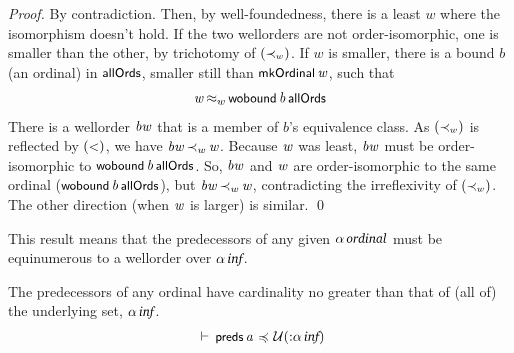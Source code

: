 \documentclass[11pt]{llncs}
\renewcommand{\HOLConst}[1]{{\textsf{\upshape\small #1}}}
\renewcommand{\HOLTyOp}[1]{\mbox{\fontencoding{T1}\fontfamily{bch}\fontseries{m}\fontshape{it}\fontsize{9.5}{10}\selectfont #1}}
\renewcommand{\HOLinline}[1]{\ensuremath{#1}}
\newenvironment{holmath}{\begin{displaymath}\begin{array}{l}}{\end{array}\end{displaymath}\ignorespacesafterend}
\begin{document}
\begin{proof}
By contradiction.
Then, by well-foundedness, there is a least $w$ where the isomorphism doesn't hold.
If the two wellorders are not order-isomorphic, one is smaller than the other, by trichotomy of \HOLinline{(\HOLConst{{\ensuremath{\prec_w}}})}.
If $w$ is smaller, there is a bound $b$ (an ordinal) in \HOLinline{\HOLConst{allOrds}}, smaller still than \HOLinline{\HOLConst{mkOrdinal}\,\HOLFreeVar{w}}, such that
\begin{holmath}
\HOLFreeVar{w}\,\ensuremath{{\approx_w}}\,\HOLConst{wobound}\,\HOLFreeVar{b}\,\HOLConst{allOrds}
\end{holmath}
There is a wellorder \HOLinline{\HOLFreeVar{bw}} that is a member of $b$'s equivalence class.
As \HOLinline{(\HOLConst{{\ensuremath{\prec_w}}})} is reflected by \HOLinline{(\HOLConst{\ensuremath{{<}}})}, we have \HOLinline{\HOLFreeVar{bw}\,{\ensuremath{\prec_w}}\,\HOLFreeVar{w}}.
Because \HOLinline{\HOLFreeVar{w}} was least, \HOLinline{\HOLFreeVar{bw}} must be order-isomorphic to \HOLinline{\HOLConst{wobound}\,\HOLFreeVar{b}\,\HOLConst{allOrds}}.
So, \HOLinline{\HOLFreeVar{bw}} and \HOLinline{\HOLFreeVar{w}} are order-isomorphic to the same ordinal (\HOLinline{\HOLConst{wobound}\,\HOLFreeVar{b}\,\HOLConst{allOrds}}), but \HOLinline{\HOLFreeVar{bw}\,{\ensuremath{\prec_w}}\,\HOLFreeVar{w}}, contradicting the irreflexivity of \HOLinline{(\HOLConst{{\ensuremath{\prec_w}}})}.
The other direction (when \HOLinline{\HOLFreeVar{w}} is larger) is similar.
\qed
\end{proof}

This result means that the predecessors of any given \HOLinline{\ensuremath{\alpha}\,\HOLTyOp{ordinal}} must be equinumerous to a wellorder over \HOLinline{\ensuremath{\alpha}\,\HOLTyOp{inf}}.

\begin{corollary}
\label{clly:card-preds}
The predecessors of any ordinal have cardinality no greater than that of (all of) the underlying set, \HOLinline{\ensuremath{\alpha}\,\HOLTyOp{inf}}.
\begin{holmath}
\HOLTokenTurnstile{}\,\HOLConst{preds}\,\HOLFreeVar{a}\,\ensuremath{{\,\HOLTokenIsPrefix\,}}\,\ensuremath{\cal{U}}(\ensuremath{{:}}\ensuremath{\alpha}\,\HOLTyOp{inf})
\end{holmath}
\end{corollary}
\end{document}
